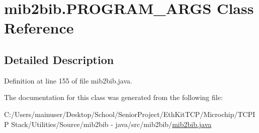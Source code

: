\hypertarget{classmib2bib_1_1mib2bib_1_1_p_r_o_g_r_a_m___a_r_g_s}{}\section{mib2bib.\+P\+R\+O\+G\+R\+A\+M\+\_\+\+A\+R\+G\+S Class Reference}
\label{classmib2bib_1_1mib2bib_1_1_p_r_o_g_r_a_m___a_r_g_s}


\subsection{Detailed Description}


Definition at line 155 of file mib2bib.\+java.



The documentation for this class was generated from the following file\+:\begin{DoxyCompactItemize}
\item 
C\+:/\+Users/mainuser/\+Desktop/\+School/\+Senior\+Project/\+Eth\+Kit\+T\+C\+P/\+Microchip/\+T\+C\+P\+I\+P Stack/\+Utilities/\+Source/mib2bib -\/ java/src/mib2bib/\hyperlink{mib2bib_8java}{mib2bib.\+java}\end{DoxyCompactItemize}

